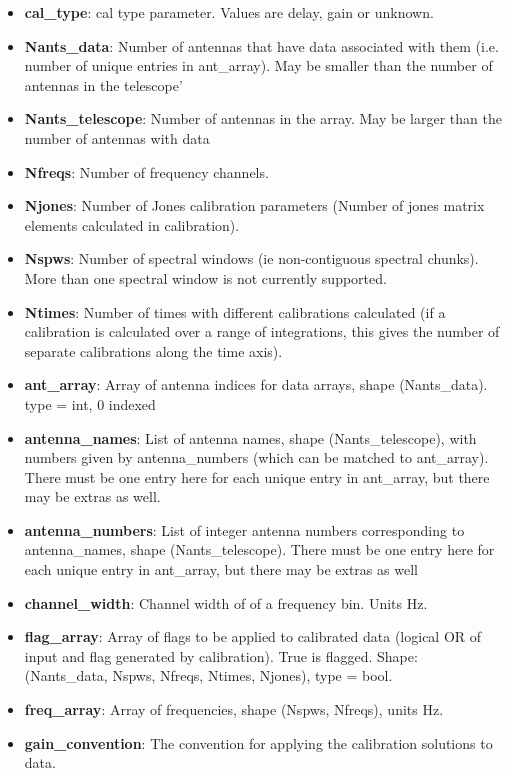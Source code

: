 \documentclass[11pt, oneside]{article}   	%
\begin{document}
\begin{itemize}
\item{\textbf{cal\_type}: cal type parameter. Values are delay, gain or
    unknown.}
\item{\textbf{Nants\_data}: Number of antennas that have data associated with them 
    (i.e. number of unique entries in ant_array). May be smaller than the number of 
    antennas in the telescope'}
\item{\textbf{Nants\_telescope}: Number of antennas in the array. May be larger
    than the number of antennas with data}
\item{\textbf{Nfreqs}: Number of frequency channels.}
\item{\textbf{Njones}: Number of Jones calibration parameters (Number of
    jones matrix elements calculated in calibration).}
\item{\textbf{Nspws}: Number of spectral windows (ie non-contiguous spectral
    chunks). More than one spectral window is not currently supported.}
\item{\textbf{Ntimes}: Number of times with different calibrations calculated
    (if a calibration is calculated over a range of integrations, this gives the
    number of separate calibrations along the time axis).}
\item{\textbf{ant\_array}: Array of antenna indices for data arrays, shape
    (Nants\_data). type = int, 0 indexed}
\item{\textbf{antenna\_names}: List of antenna names, shape (Nants\_telescope),
    with numbers given by antenna\_numbers (which can be matched to ant\_array).
    There must be one entry here for each unique entry in ant\_array, but there may be extras as well.}
\item{\textbf{antenna\_numbers}: List of integer antenna numbers corresponding
    to antenna\_names, shape (Nants\_telescope). There must be one entry here for each unique entry 
    in ant_array, but there may be extras as well}
\item{\textbf{channel\_width}: Channel width of of a frequency bin. Units Hz.}
\item{\textbf{flag\_array}: Array of flags to be applied to calibrated data
    (logical OR of input and flag generated by calibration). True is flagged.
    Shape: (Nants\_data, Nspws, Nfreqs, Ntimes, Njones), type = bool.}
\item{\textbf{freq\_array}: Array of frequencies, shape (Nspws, Nfreqs), units
    Hz.}
\item{\textbf{gain\_convention}: The convention for applying the calibration solutions to data.
}
\end{itemize}
\end{document}
